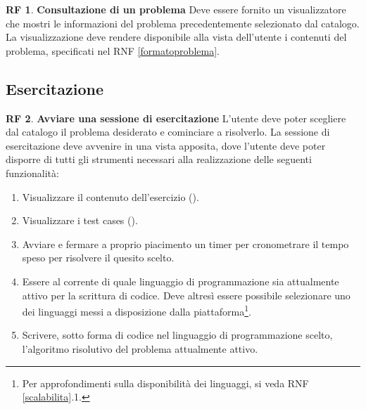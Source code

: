 \documentclass[11pt, a4paper]{article}
\theoremstyle{definition}
\newtheorem{funcreq}{RF} %
\begin{document}
\begin{funcreq}
\label{seeproblem}
\textbf{Consultazione di un problema }
Deve essere fornito un visualizzatore che mostri le informazioni del
problema precedentemente selezionato dal catalogo. La visualizzazione
deve rendere disponibile alla vista dell'utente i contenuti del
problema, specificati nel RNF \ref{formatoproblema}.
\end{funcreq}

\subsection{Esercitazione}
\begin{funcreq}
\label{exesession}
\textbf{Avviare una sessione di esercitazione }
L'utente deve poter scegliere dal catalogo il problema desiderato e cominciare
a risolverlo. La sessione di esercitazione deve avvenire in una vista apposita, dove
l'utente deve poter disporre di tutti gli strumenti necessari alla realizzazione
delle seguenti funzionalità:
\begin{enumerate}
    \item Visualizzare il contenuto dell'esercizio ().
    
    \item Visualizzare i test cases ().

    \item Avviare e fermare a proprio piacimento un timer per cronometrare
    il tempo speso per risolvere il quesito scelto.
    
    \item Essere al corrente di quale linguaggio di programmazione sia
    attualmente attivo per la scrittura di codice. Deve altresì essere 
    possibile selezionare uno dei linguaggi messi a disposizione dalla
    piattaforma\footnote{Per approfondimenti sulla disponibilità dei
    linguaggi, si veda RNF \ref{scalabilita}.1.}.

    
    \item Scrivere, sotto forma di codice nel linguaggio di programmazione
    scelto, l'algoritmo risolutivo del problema attualmente attivo.
\end{enumerate}
\end{funcreq}
\end{document}

